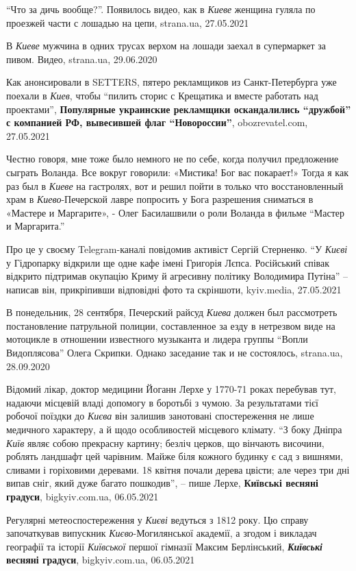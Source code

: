 \enquote{Что за дичь вообще?}. Появилось видео, как в \emph{Киеве} женщина
гуляла по проезжей части с лошадью на цепи, strana.ua, 27.05.2021

В \emph{Киеве} мужчина в одних трусах верхом на лошади заехал в супермаркет за пивом.
Видео, strana.ua, 29.06.2020

Как анонсировали в SETTERS, пятеро рекламщиков из Санкт-Петербурга уже поехали
в \emph{Киев}, чтобы \enquote{пилить сторис с Крещатика и вместе работать над
проектами}, \textbf{Популярные украинские рекламщики оскандалились
\enquote{дружбой} с компанией РФ, вывесившей флаг \enquote{Новороссии}},
obozrevatel.com, 27.05.2021

Честно говоря, мне тоже было немного не по себе, когда получил предложение
сыграть Воланда. Все вокруг говорили: «Мистика! Бог вас покарает!» Тогда я как
раз был в \emph{Киеве} на гастролях, вот и решил пойти в только что восстановленный
храм в \emph{Киево}-Печерской лавре попросить у Бога разрешения сниматься в «Мастере и
Маргарите», - Олег Басилашвили о роли Воланда в фильме  \enquote{Мастер и Маргарита.}

Про це у своєму Telegram-каналі повідомив активіст Сергій Стерненко.
\enquote{У \emph{Києві} у Гідропарку відкрили ще одне кафе імені Григорія
Лєпса.  Російський співак відкрито підтримав окупацію Криму й агресивну
політику Володимира Путіна} – написав він, прикріпивши відповідні фото та
скріншоти, kyiv.media, 27.05.2021

В понедельник, 28 сентября, Печерский райсуд \emph{Киева} должен был
рассмотреть постановление патрульной полиции, составленное за езду в нетрезвом
виде на мотоцикле в отношении известного музыканта и лидера группы
\enquote{Вопли Видоплясова} Олега Скрипки. Однако заседание так и не
состоялось, strana.ua, 28.09.2020

Відомий лікар, доктор медицини Йоганн Лерхе у 1770-71 роках перебував тут,
надаючи місцевій владі допомогу в боротьбі з чумою. За результатами тієї
робочої поїздки до \emph{Києва} він залишив занотовані спостереження не лише
медичного характеру, а й щодо особливостей місцевого клімату.  \enquote{З боку
Дніпра \emph{Київ} являє собою прекрасну картину; безліч церков, що вінчають
височини, роблять ландшафт цей чарівним. Майже біля кожного будинку є сад з
вишнями, сливами і горіховими деревами. 18 квітня почали дерева цвісти; але
через три дні випав сніг, який дуже багато пошкодив}, – пише Лерхе, \textbf{Київські
весняні градуси}, bigkyiv.com.ua, 06.05.2021

Регулярні метеоспостереження у \emph{Києві} ведуться з 1812 року. Цю справу
започаткував випускник \emph{Києво}-Могилянської академії, а згодом і викладач
географії та історії \emph{Київської} першої гімназії Максим Берлінський,
\textbf{\emph{Київські} весняні градуси}, bigkyiv.com.ua, 06.05.2021

